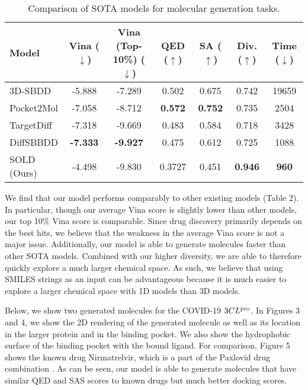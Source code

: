 \documentclass[11pt]{article}
\begin{document}
\begin{table}[H]
    \centering
    \begin{tabular}{l|c|c|c|c|c|c}
    \hline
    \textbf{Model} & \textbf{Vina ($\downarrow$)} & \textbf{Vina (Top-10\%) ($\downarrow$)} & \textbf{QED ($\uparrow$)} & \textbf{SA ($\uparrow$)} & \textbf{Div. ($\uparrow$)} & \textbf{Time ($\downarrow$)} \\ \hline
    3D-SBDD \cite{luo20223dgenerativemodelstructurebased} & -5.888 & -7.289 & \cellcolor{lightgray}0.502 & \cellcolor{lightgray}0.675 & \cellcolor{lightgray}0.742 & 19659 \\ 
    Pocket2Mol \cite{peng2022pocket2molefficientmolecularsampling} & -7.058 & -8.712 & \cellcolor{darkgray}\textbf{0.572} & \cellcolor{darkgray}\textbf{0.752} & 0.735 & 2504 \\ 
    TargetDiff \cite{guan2023d} & \cellcolor{lightgray}-7.318 & -9.669 & 0.483 & 0.584 & 0.718 & 3428 \\ 
    DiffSBBDD \cite{schneuing2023} & \cellcolor{darkgray}\textbf{-7.333} & \cellcolor{darkgray}\textbf{-9.927} & 0.475 & 0.612 & 0.725 & \cellcolor{lightgray}1088 \\ 
    \hline 
    SOLD (Ours) & -4.498 & \cellcolor{lightgray}-9.830 & 0.3727 & 0.451 & \cellcolor{darkgray}\textbf{0.946} & \cellcolor{darkgray}\textbf{960} \\ \hline
    \end{tabular}
    \caption{Comparison of SOTA models for molecular generation tasks.}
\end{table}

We find that our model performs comparably to other existing models (Table 2). 
In particular, though our average Vina score is slightly lower than other 
models, our top 10\% Vina score is comparable. Since drug discovery 
primarily depends on the best hits, we believe that the weakness in 
the average Vina score is not a major issue. Additionally, our model 
is able to generate molecules faster than other SOTA models. Combined with 
our higher diversity, we are able to therefore quickly explore a much larger 
chemical space. As such, we believe that using SMILES strings 
as an input can be advantageous because it is much easier to explore 
a larger chemical space with 1D models than 3D models. 

Below, we show two generated molecules for the COVID-19 $3CL\textsuperscript{pro}$. In Figures 3 and 4, we show 
the 2D rendering of the generated molecule as well as its location in the 
larger protein and in the binding pocket. We also show the hydrophobic 
surface of the binding pocket with the bound ligand. For comparison, Figure 5 
shows the known drug Nirmatrelvir, which is a part of the Paxlovid drug combination 
\cite{Reina2022-xy}. As can be seen, our model is able to generate molecules that 
have similar QED and SAS scores to known drugs but much better docking scores.
\end{document}
